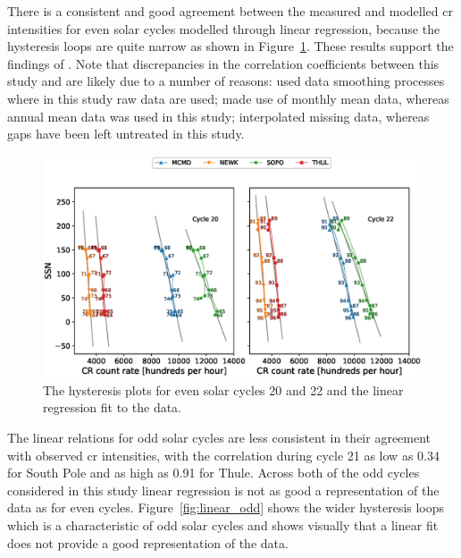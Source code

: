 There is a consistent and good agreement between the measured and modelled \gls{cr} intensities for even solar cycles modelled through linear regression, because the hysteresis loops are quite narrow as shown in Figure~\ref{fig:linear_even}. These results support the findings of \cite{inceoglu_modeling_2014}. Note that discrepancies in the correlation coefficients between this study and \cite{inceoglu_modeling_2014} are likely due to a number of reasons: \cite{inceoglu_modeling_2014} used data smoothing processes where in this study raw data are used; \cite{inceoglu_modeling_2014} made use of monthly mean data, whereas annual mean data was used in this study; \cite{inceoglu_modeling_2014} interpolated missing data, whereas gaps have been left untreated in this study.

\begin{figure}
	\includegraphics[width=\columnwidth]{linear_even.eps}
	\caption{The hysteresis plots for even solar cycles 20 and 22 and the linear regression fit to the data.}
	\label{fig:linear_even}
\end{figure}

The linear relations for odd solar cycles are less consistent in their agreement with observed \gls{cr} intensities, with the correlation during cycle 21 as low as 0.34 for South Pole and as high as 0.91 for Thule. Across both of the odd cycles considered in this study linear regression is not as good a representation  of the data as for even cycles. Figure~\ref{fig:linear_odd} shows the wider hysteresis loops which is a characteristic of odd solar cycles and shows visually that a linear fit does not provide a good representation of the data. 

